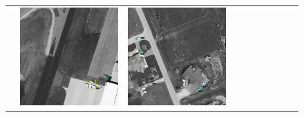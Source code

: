 \begin{figure}[h!]
\begin{tabularx}{\textwidth}{c|*{9}{X}}
    &  \includegraphics[trim={650pt 120pt 170pt 720pt},clip,width=\linewidth]{images/015Results/03ablation/comp_images/blue/487.png}
    & \includegraphics[trim={230pt 200pt 680pt 725pt},clip,width=\linewidth]{images/015Results/03ablation/comp_images/blue/509.png}

\end{tabularx}
\end{figure}
